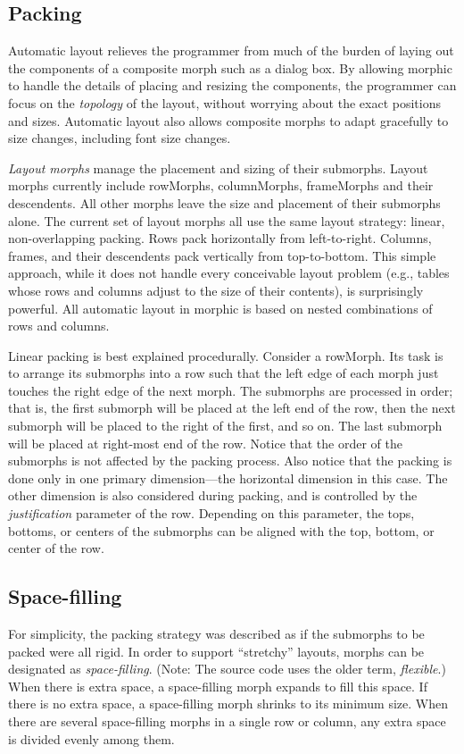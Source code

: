 \documentclass[letterpaper,10pt,english]{sphinxmanual}
\begin{document}
\subsection{Packing}
\label{morphic:packing}
Automatic layout relieves the programmer from much of the burden of laying out the components of a composite morph such as a dialog box. By allowing morphic to handle the details of placing and resizing the components, the programmer can focus on the \emph{topology} of the layout, without worrying about the exact positions and sizes. Automatic layout also allows composite morphs to adapt gracefully to size changes, including font size changes.

\emph{Layout morphs} manage the placement and sizing of their submorphs. Layout morphs currently include rowMorphs, columnMorphs, frameMorphs and their descendents. All other morphs leave the size and placement of their submorphs alone. The current set of layout morphs all use the same layout strategy: linear, non-overlapping packing. Rows pack horizontally from left-to-right. Columns, frames, and their descendents pack vertically from top-to-bottom. This simple approach, while it does not handle every conceivable layout problem (e.g., tables whose rows and columns adjust to the size of their contents), is surprisingly powerful. All automatic layout in morphic is based on nested combinations of rows and columns.

Linear packing is best explained procedurally. Consider a rowMorph. Its task is to arrange its submorphs into a row such that the left edge of each morph just touches the right edge of the next morph. The submorphs are processed in order; that is, the first submorph will be placed at the left end of the row, then the next submorph will be placed to the right of the first, and so on. The last submorph will be placed at right-most end of the row. Notice that the order of the submorphs is not affected by the packing process. Also notice that the packing is done only in one primary dimension—the horizontal dimension in this case. The other dimension is also considered during packing, and is controlled by the \emph{justification} parameter of the row. Depending on this parameter, the tops, bottoms, or centers of the submorphs can be aligned with the top, bottom, or center of the row.


\subsection{Space-filling}
\label{morphic:space-filling}
For simplicity, the packing strategy was described as if the submorphs to be packed were all rigid. In order to support ``stretchy'' layouts, morphs can be designated as \emph{space-filling}. (Note: The source code uses the older term, \emph{flexible}.) When there is extra space, a space-filling morph expands to fill this space. If there is no extra space, a space-filling morph shrinks to its minimum size. When there are several space-filling morphs in a single row or column, any extra space is divided evenly among them.
\end{document}
